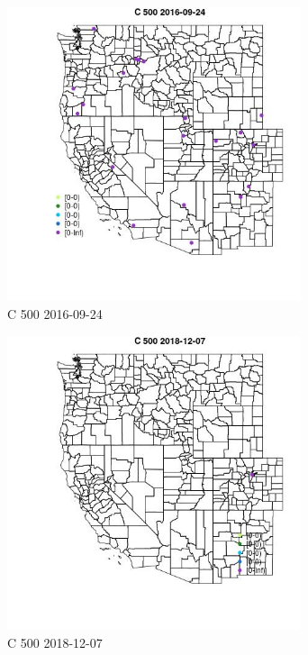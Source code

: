 \begin{figure} 
\centering  
\includegraphics[width=0.77\textwidth]{Code_Outputs/Report_ML_input_PM25_Step4_part_e_de_duplicated_aves_MapObsC_5002016-09-24.jpg} 
\caption{\label{fig:Report_ML_input_PM25_Step4_part_e_de_duplicated_avesMapObsC_5002016-09-24}C 500 2016-09-24} 
\end{figure} 
 

\begin{figure} 
\centering  
\includegraphics[width=0.77\textwidth]{Code_Outputs/Report_ML_input_PM25_Step4_part_e_de_duplicated_aves_MapObsC_5002018-12-07.jpg} 
\caption{\label{fig:Report_ML_input_PM25_Step4_part_e_de_duplicated_avesMapObsC_5002018-12-07}C 500 2018-12-07} 
\end{figure} 
 

